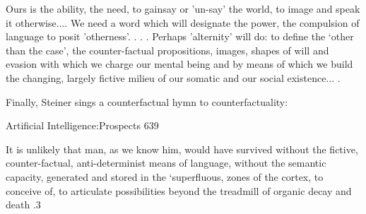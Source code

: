    Ours is the ability, the need, to gainsay or 'un-say' the world, to image and speak it
   otherwise.... We need a word which will designate the power, the compulsion of
   language to posit 'otherness'. . . . Perhaps 'alternity' will do: to define the `other than
   the case', the counter-factual propositions, images, shapes of will and evasion with
   which we charge our mental being and by means of which we build the changing,
   largely fictive milieu of our somatic and our social existence... .

Finally, Steiner sings a counterfactual hymn to counterfactuality:


Artificial Intelligence:Prospects                                                            639

It is unlikely that man, as we know him, would have survived without the fictive,
counter-factual, anti-determinist means of language, without the semantic capacity,
generated and stored in the `superfluous, zones of the cortex, to conceive of, to articulate
possibilities beyond the treadmill of organic decay and death .3

